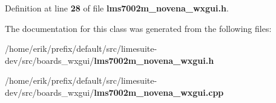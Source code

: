 Definition at line {\bf 28} of file {\bf lms7002m\+\_\+novena\+\_\+wxgui.\+h}.



The documentation for this class was generated from the following files\+:\begin{DoxyCompactItemize}
\item 
/home/erik/prefix/default/src/limesuite-\/dev/src/boards\+\_\+wxgui/{\bf lms7002m\+\_\+novena\+\_\+wxgui.\+h}\item 
/home/erik/prefix/default/src/limesuite-\/dev/src/boards\+\_\+wxgui/{\bf lms7002m\+\_\+novena\+\_\+wxgui.\+cpp}\end{DoxyCompactItemize}
